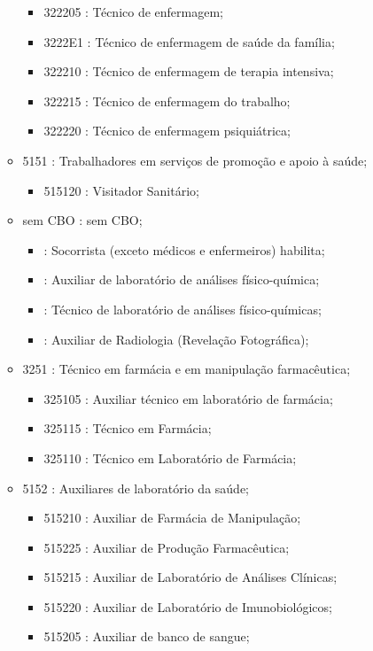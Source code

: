 \begin{itemize}
\begin{itemize}
\begin{itemize}
      \item 322205 : Técnico de enfermagem;
      \item 3222E1 : Técnico de enfermagem de saúde da família;
      \item 322210 : Técnico de enfermagem de terapia intensiva;
      \item 322215 : Técnico de enfermagem do trabalho;
      \item 322220 : Técnico de enfermagem psiquiátrica;
    \end{itemize}
    \item 5151 : Trabalhadores em serviços de promoção e apoio à saúde;
    \begin{itemize}
      \item 515120 : Visitador Sanitário;
    \end{itemize}
    \item sem CBO : sem CBO;
    \begin{itemize}
      \item  : Socorrista (exceto médicos e enfermeiros) habilita;
      \item  : Auxiliar de laboratório de análises físico-química;
      \item  : Técnico de laboratório de análises físico-químicas;
      \item  : Auxiliar de Radiologia (Revelação Fotográfica);
    \end{itemize}
    \item 3251 : Técnico em farmácia e em manipulação farmacêutica;
    \begin{itemize}
      \item 325105 : Auxiliar técnico em laboratório de farmácia;
      \item 325115 : Técnico em Farmácia;
      \item 325110 : Técnico em Laboratório de Farmácia;
    \end{itemize}
    \item 5152 : Auxiliares de laboratório da saúde;
    \begin{itemize}
      \item 515210 : Auxiliar de Farmácia de Manipulação;
      \item 515225 : Auxiliar de Produção Farmacêutica;
      \item 515215 : Auxiliar de Laboratório de Análises Clínicas;
      \item 515220 : Auxiliar de Laboratório de Imunobiológicos;
      \item 515205 : Auxiliar de banco de sangue;

\end{itemize}
\end{itemize}
\end{itemize}
